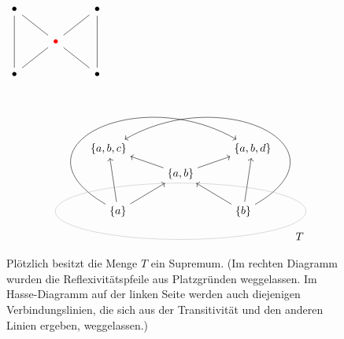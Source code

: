 \begin{bem}[*]
	\begin{figure}[H]
$\begin{tikzcd}
    \bullet && \bullet \\
    & \color{red}{\bullet} \ar[lu, dash] \ar[ru, dash] & \\
    \bullet \ar[uu, dash] \ar[ru, dash] && \bullet \ar[uu, dash] \ar[lu, dash]
   \end{tikzcd}$ $\begin{tikzpicture}[commutative diagrams/every diagram]
			\node (a) at (-2,0) {$\{a\}$};
			\node (b) at (2,0) {$\{b\}$};
			\node (ab) at (0,1.2) {$\{a,b\}$};
			\node (abc) at (-2.3,2) {$\{a,b,c\}$};
			\node (abd) at (2.3,2) {$\{a,b,d\}$};
			\path[commutative diagrams/.cd, every arrow, every label]
			(a) edge (abc)
			(a) edge[out=150,in=150, looseness=2] (abd)
			(b) edge[out=30,in=30, looseness=2] (abc)
			(b) edge (abd)
			(a) edge (ab)
			(b) edge (ab)
			(ab) edge (abc)
			(ab) edge (abd)
			;
			\draw[help lines] (0,0) ellipse (4cm and .9cm);
			\node at (3.8,-.8) {$T$};
		\end{tikzpicture}$
    	\centering \caption{Plötzlich besitzt die Menge $T$ ein Supremum. (Im rechten Diagramm wurden die Reflexivitätspfeile aus Platzgründen weggelassen. Im Hasse-Diagramm auf der linken Seite werden auch diejenigen Verbindungslinien, die sich aus der Transitivität und den anderen Linien ergeben, weggelassen.)}
	\end{figure}

\end{bem}

